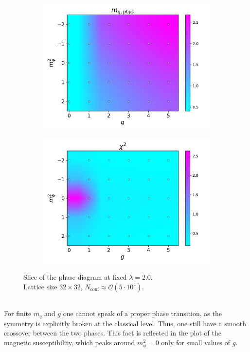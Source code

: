 \begin{figure}[htp]
\begin{subfigure}[b]{0.48\textwidth}
        \includegraphics[width=\textwidth]{figures/phase_diagram/g-m/m_g_mq.pdf}
    \end{subfigure}
    \begin{subfigure}[b]{0.48\textwidth}
        \includegraphics[width=\textwidth]{figures/phase_diagram/g-m/m_g_chi2.pdf}
    \end{subfigure}
    \caption{Slice of the phase diagram at fixed $\lambda = 2.0$. \\ Lattice size $32 \times 32$, $N_\text{conf} \approx \mathcal{O}(5 \cdot 10^4)$.}
    \label{fig:phase_diagram_g_m}
\end{figure}\\
For finite $m_q$ and $g$ one cannot speak of a proper phase transition, as the symmetry is explicitly broken at the classical level. Thus, one still have a smooth crossover between the two phases. This fact is reflected in the plot of the magnetic susceptibility, which peaks around $m_\phi^2 = 0$ only for small values of $g$. \\
